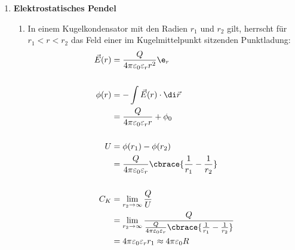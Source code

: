 \documentclass[11pt,letterpaper]{article}
\begin{document}

\begin{enumerate}
    \item \textbf{Elektrostatisches Pendel}
        \begin{enumerate}
            \item
            In einem Kugelkondensator mit den Radien $r_1$ und 
            $r_2$ gilt, herrscht für  $r_1<r<r_2$ das Feld einer
            im Kugelmittelpunkt sitzenden Punktladung:   
            \begin{align*}
                \vec{E}(r) &= \frac{Q}{4 \pi \varepsilon_0 \varepsilon_r r^2}\e_{r}\\
                \\
                \phi(r) &= - \int \vec{E}(r) \cdot \di \vec{r}\\
                &= \frac{Q}{4 \pi \varepsilon_0 \varepsilon_r r} + \phi_0\\
                \\
                U &= \phi(r_1) - \phi(r_2)\\
                &= \frac{Q}{4 \pi \varepsilon_0 \varepsilon_r} \cbrace{\frac{1}{r_1}-\frac{1}{r_2}}\\
                \\
                C_K &= \lim_{r_2\to \infty}\frac{Q}{U}\\
                &= \lim_{r_2\to \infty}\frac{Q}{\frac{Q}{4 \pi \varepsilon_0 \varepsilon_r} \cbrace{\frac{1}{r_1}-\frac{1}{r_2}}}\\
                &= 4 \pi \varepsilon_0 \varepsilon_r r_1 \approx 4 \pi \varepsilon_0 R \\
            \end{align*}


\end{enumerate}
\end{enumerate}
\end{document}
